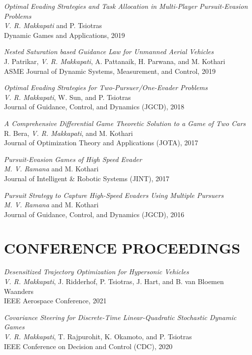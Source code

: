 \documentclass[margin, 10pt]{res} %
\begin{document}
\begin{resume}
{\sl Optimal Evading Strategies and Task Allocation in Multi-Player Pursuit-Evasion Problems} \\
\textit{V. R. Makkapati} and P. Tsiotras \\
Dynamic Games and Applications, 2019

{\sl Nested Saturation based Guidance Law for Unmanned Aerial Vehicles} \\
J. Patrikar, \textit{V. R. Makkapati}, A. Pattanaik, H. Parwana, and M. Kothari \\
ASME Journal of Dynamic Systems, Measurement, and Control, 2019

{\sl Optimal Evading Strategies for Two-Pursuer/One-Evader Problems} \\
\textit{V. R. Makkapati}, W. Sun, and P. Tsiotras \\
Journal of Guidance, Control, and Dynamics (JGCD), 2018

{\sl A Comprehensive Differential Game Theoretic Solution to a Game of Two Cars} \\ 
R. Bera, \textit{V. R. Makkapati}, and M. Kothari \\
Journal of Optimization Theory and Applications (JOTA), 2017 

{\sl Pursuit-Evasion Games of High Speed Evader} \\ 
\textit{M. V. Ramana} and M. Kothari \\
Journal of Intelligent \& Robotic Systems (JINT), 2017

{\sl Pursuit Strategy to Capture High-Speed Evaders Using Multiple Pursuers} \\
\textit{M. V. Ramana} and M. Kothari \\
Journal of Guidance, Control, and Dynamics (JGCD), 2016

\section{CONFERENCE PROCEEDINGS}

{\sl Desensitized Trajectory Optimization for Hypersonic Vehicles }\\
\textit{V. R. Makkapati}, J. Ridderhof, P. Tsiotras, J. Hart, and  B. van Bloemen Waanders\\
IEEE Aerospace Conference, 2021

{\sl Covariance Steering for Discrete-Time Linear-Quadratic Stochastic Dynamic Games}\\
\textit{V. R. Makkapati}, T. Rajpurohit, K. Okamoto, and P. Tsiotras \\
IEEE Conference on Decision and Control (CDC), 2020 


\end{resume}
\end{document}
